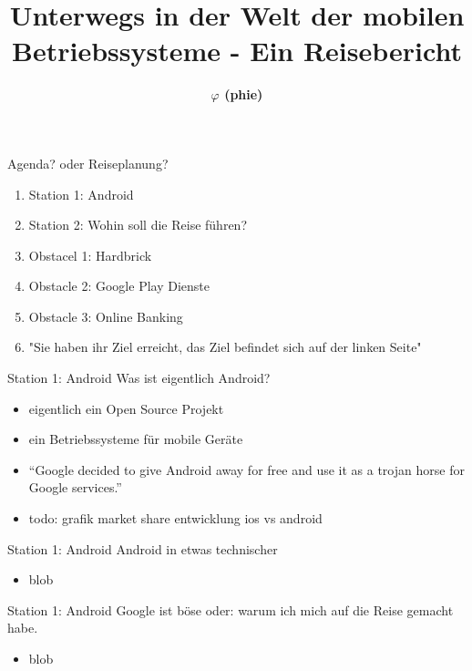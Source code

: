 \documentclass[14pt,compress,usenames,dvipsnames,aspectratio=169]{beamer}
\title{\textbf{Unterwegs in der Welt der mobilen Betriebssysteme - Ein Reisebericht}}
\author{\textbf{$\varphi$ (phie)}}
\date{}
\begin{document}

\begin{frame}[plain]
\titlepage
\end{frame}

\begin{frame}{Agenda? oder Reiseplanung?}
    \begin{enumerate}
        \item Station 1: Android
        \item Station 2: Wohin soll die Reise führen?
        \item Obstacel 1: Hardbrick
        \item Obstacle 2: Google Play Dienste
        \item Obstacle 3: Online Banking
        \item "Sie haben ihr Ziel erreicht, das Ziel befindet sich auf der linken Seite"
    \end{enumerate}
\end{frame}

\begin{frame}{Station 1: Android}
    Was ist eigentlich Android? 
    \begin{itemize}
        \item eigentlich ein Open Source Projekt
        \item ein Betriebssysteme für mobile Geräte
        \item “Google decided to give Android away for free and use it as a trojan horse for Google services.”
        \item todo: grafik market share entwicklung ios vs android
    \end{itemize}
\end{frame}

\begin{frame}{Station 1: Android}
    Android in etwas technischer
    \begin{itemize}
        \item blob
    \end{itemize}
\end{frame}

\begin{frame}{Station 1: Android}
    Google ist böse oder: warum ich mich auf die Reise gemacht habe.
    \begin{itemize}
        \item blob
    \end{itemize}
\end{frame}
\end{document}
